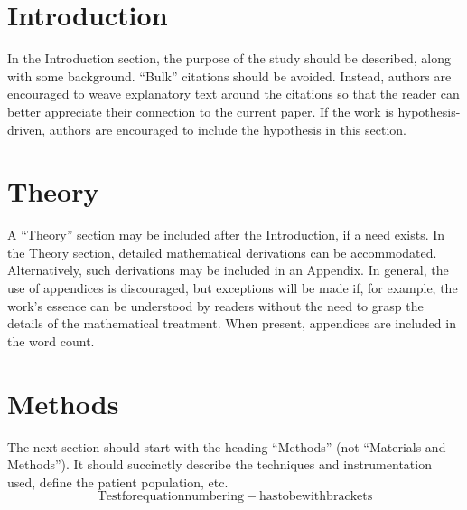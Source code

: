 \documentclass[11pt]{article}
\begin{document}
\pagebreak



\section{Introduction}

In the Introduction section, the purpose of the study should be described, along with some background. “Bulk” citations should be avoided.  Instead, authors are encouraged to weave explanatory text around the citations so that the reader can better appreciate their connection to the current paper. If the work is hypothesis-driven, authors are encouraged to include the hypothesis in this section.



\section{Theory}

A “Theory” section may be included after the Introduction, if a need exists. In the Theory section, detailed mathematical derivations can be accommodated. Alternatively, such derivations may be included in an Appendix. In general, the use of appendices is discouraged, but exceptions will be made if, for example, the work’s essence can be understood by readers without the need to grasp the details of the mathematical treatment. When present, appendices are included in the word count.


\section{Methods}

The next section should start with the heading “Methods” (not “Materials and Methods”). It should succinctly describe the techniques and instrumentation used, define the patient population, etc.
\begin{equation}
\mathrm{Test for equation numbering - has to be with brackets}
\end{equation}
\end{document}

